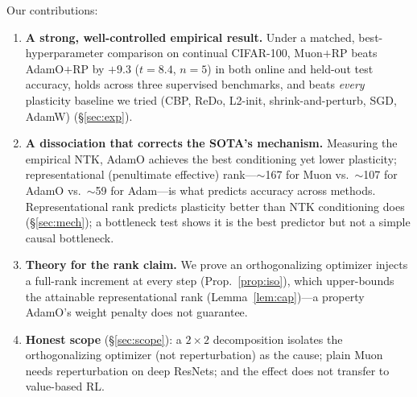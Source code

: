 \documentclass[letterpaper]{article} %
\begin{document}
Our contributions:
\begin{enumerate}\itemsep2pt
\item \textbf{A strong, well-controlled empirical result.} Under a matched, best-hyperparameter comparison on continual CIFAR-100, Muon$+$RP beats AdamO$+$RP by $+9.3$ ($t{=}8.4$, $n{=}5$) in both online and held-out test accuracy, holds across three supervised benchmarks, and beats \emph{every} plasticity baseline we tried (CBP, ReDo, L2-init, shrink-and-perturb, SGD, AdamW) (\S\ref{sec:exp}).
\item \textbf{A dissociation that corrects the SOTA's mechanism.} Measuring the empirical NTK, AdamO achieves the best conditioning yet lower plasticity; representational (penultimate effective) rank---$\sim$167 for Muon vs.\ $\sim$107 for AdamO vs.\ $\sim$59 for Adam---is what predicts accuracy across methods. Representational rank predicts plasticity better than NTK conditioning does (\S\ref{sec:mech}); a bottleneck test shows it is the best predictor but not a simple causal bottleneck.
\item \textbf{Theory for the rank claim.} We prove an orthogonalizing optimizer injects a full-rank increment at every step (Prop.~\ref{prop:iso}), which upper-bounds the attainable representational rank (Lemma~\ref{lem:cap})---a property AdamO's weight penalty does not guarantee.
\item \textbf{Honest scope} (\S\ref{sec:scope}): a $2{\times}2$ decomposition isolates the orthogonalizing optimizer (not reperturbation) as the cause; plain Muon needs reperturbation on deep ResNets; and the effect does not transfer to value-based RL.
\end{enumerate}
\end{document}
